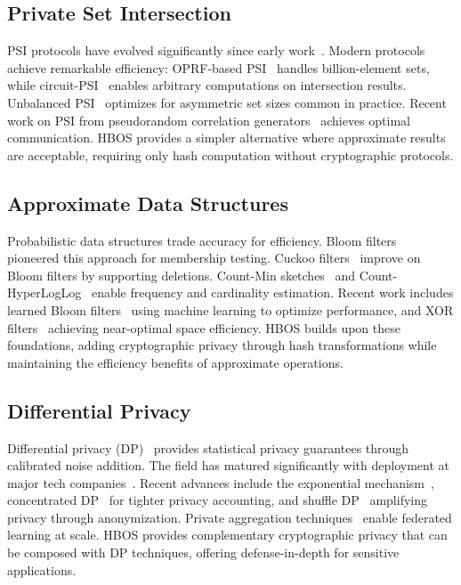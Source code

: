 \documentclass[10pt,conference]{IEEEtran}
\begin{document}
\subsection{Private Set Intersection}

PSI protocols have evolved significantly since early work~\cite{meadows1986more, freedman2004efficient}. Modern protocols achieve remarkable efficiency: OPRF-based PSI~\cite{raghuraman2022blazing} handles billion-element sets, while circuit-PSI~\cite{chandran2022circuit} enables arbitrary computations on intersection results. Unbalanced PSI~\cite{chen2022blazing} optimizes for asymmetric set sizes common in practice. Recent work on PSI from pseudorandom correlation generators~\cite{schoppmann2023psi} achieves optimal communication. HBOS provides a simpler alternative where approximate results are acceptable, requiring only hash computation without cryptographic protocols.

\subsection{Approximate Data Structures}

Probabilistic data structures trade accuracy for efficiency. Bloom filters~\cite{bloom1970space} pioneered this approach for membership testing. Cuckoo filters~\cite{fan2014cuckoo} improve on Bloom filters by supporting deletions. Count-Min sketches~\cite{cormode2005improved} and Count-HyperLogLog~\cite{ting2020count} enable frequency and cardinality estimation. Recent work includes learned Bloom filters~\cite{kraska2018case} using machine learning to optimize performance, and XOR filters~\cite{graf2020xor} achieving near-optimal space efficiency. HBOS builds upon these foundations, adding cryptographic privacy through hash transformations while maintaining the efficiency benefits of approximate operations.

\subsection{Differential Privacy}

Differential privacy (DP)~\cite{dwork2006calibrating} provides statistical privacy guarantees through calibrated noise addition. The field has matured significantly with deployment at major tech companies~\cite{erlingsson2014rappor, apple2017differential}. Recent advances include the exponential mechanism~\cite{mcsherry2021exponential}, concentrated DP~\cite{bun2016concentrated} for tighter privacy accounting, and shuffle DP~\cite{erlingsson2019amplification} amplifying privacy through anonymization. Private aggregation techniques~\cite{bonawitz2021practical} enable federated learning at scale. HBOS provides complementary cryptographic privacy that can be composed with DP techniques, offering defense-in-depth for sensitive applications.
\end{document}

